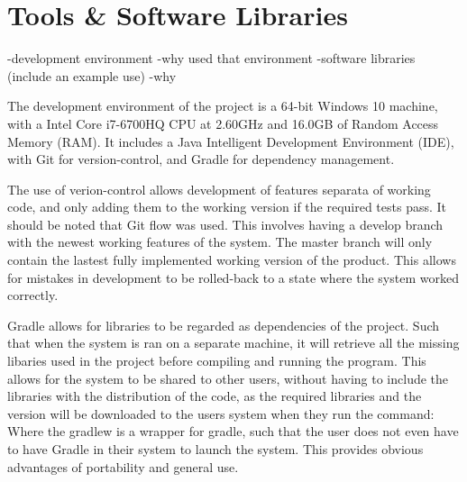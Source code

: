 \section{Tools \& Software Libraries}
-development environment
-why used that environment
-software libraries (include an example use)
-why
\par The development environment of the project is a 64-bit Windows 10 machine, with a Intel Core i7-6700HQ CPU at 2.60GHz and 16.0GB of Random Access Memory (RAM). It includes a Java Intelligent Development Environment (IDE), with Git for version-control, and Gradle for dependency management. 
\par The use of verion-control allows development of features separata of working code, and only adding them to the working version if the required tests pass. It should be noted that Git flow was used. This involves having a develop branch with the newest working features of the system. The master branch will only contain the lastest fully implemented working version of the product. This allows for mistakes in development to be rolled-back to a state where the system worked correctly.
\par Gradle allows for libraries to be regarded as dependencies of the project. Such that when the system is ran on a separate machine, it will retrieve all the missing libaries used in the project before compiling and running the program. This allows for the system to be shared to other users, without having to include the libraries with the distribution of the code, as the required libraries and the version will be downloaded to the users system when they run the command:  Where the gradlew is a wrapper for gradle, such that the user does not even have to have Gradle in their system to launch the system. This provides obvious advantages of portability and general use.

